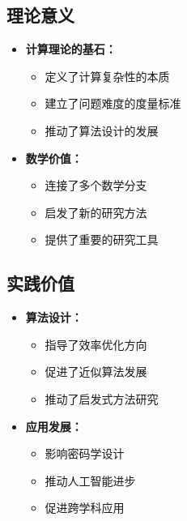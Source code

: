 \documentclass[a4paper,12pt]{ctexart}
\begin{document}
\subsection{理论意义}
\begin{itemize}
    \item \textbf{计算理论的基石：}
        \begin{itemize}
            \item 定义了计算复杂性的本质
            \item 建立了问题难度的度量标准
            \item 推动了算法设计的发展
        \end{itemize}
    \item \textbf{数学价值：}
        \begin{itemize}
            \item 连接了多个数学分支
            \item 启发了新的研究方法
            \item 提供了重要的研究工具
        \end{itemize}
\end{itemize}

\subsection{实践价值}
\begin{itemize}
    \item \textbf{算法设计：}
        \begin{itemize}
            \item 指导了效率优化方向
            \item 促进了近似算法发展
            \item 推动了启发式方法研究
        \end{itemize}
    \item \textbf{应用发展：}
        \begin{itemize}
            \item 影响密码学设计
            \item 推动人工智能进步
            \item 促进跨学科应用
        \end{itemize}
\end{itemize}
\end{document}
